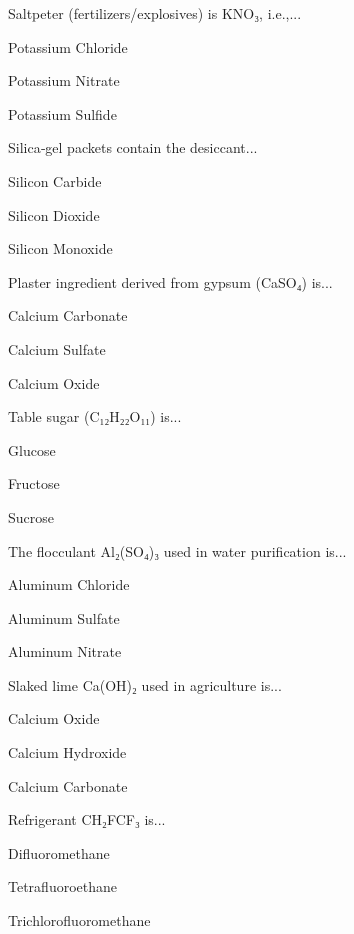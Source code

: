\begin{enhancedmcq}{Saltpeter (fertilizers/explosives) is KNO₃, i.e.,...}
\item Potassium Chloride
\item Potassium Nitrate
\item Potassium Sulfide

\end{enhancedmcq}
\begin{enhancedmcq}{Silica‑gel packets contain the desiccant...}
\item Silicon Carbide
\item Silicon Dioxide
\item Silicon Monoxide

\end{enhancedmcq}
\begin{enhancedmcq}{Plaster ingredient derived from gypsum (CaSO₄) is...}
\item Calcium Carbonate
\item Calcium Sulfate
\item Calcium Oxide

\end{enhancedmcq}
\begin{enhancedmcq}{Table sugar (C₁₂H₂₂O₁₁) is...}
\item Glucose
\item Fructose
\item Sucrose

\end{enhancedmcq}
\begin{enhancedmcq}{The flocculant Al₂(SO₄)₃ used in water purification is...}
\item Aluminum Chloride
\item Aluminum Sulfate
\item Aluminum Nitrate

\end{enhancedmcq}
\begin{enhancedmcq}{Slaked lime Ca(OH)₂ used in agriculture is...}
\item Calcium Oxide
\item Calcium Hydroxide
\item Calcium Carbonate

\end{enhancedmcq}
\begin{enhancedmcq}{Refrigerant CH₂FCF₃ is...}
\item Difluoromethane
\item Tetrafluoroethane
\item Trichlorofluoromethane

\end{enhancedmcq}
